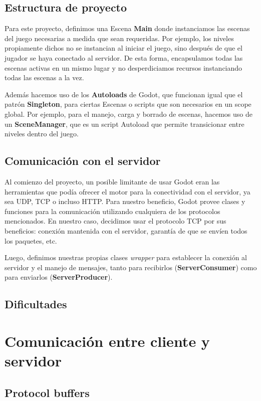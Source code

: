 \documentclass[12pt]{article}
\begin{document}
\subsection{Estructura de proyecto}

Para este proyecto, definimos una Escena \textbf{Main} donde instanciamos las escenas del juego necesarias a medida que sean requeridas. Por ejemplo, los niveles propiamente dichos no se instancian al iniciar el juego, sino después de que el jugador se haya conectado al servidor. De esta forma, encapsulamos todas las escenas activas en un mismo lugar y no desperdiciamos recursos instanciando todas las escenas a la vez.

Además hacemos uso de los \textbf{Autoloads} de Godot, que funcionan igual que el patrón \textbf{Singleton}, para ciertas Escenas o scripts que son necesarios en un scope global. Por ejemplo, para el manejo, carga y borrado de escenas, hacemos uso de un \textbf{SceneManager}, que es un script Autoload que permite transicionar entre niveles dentro del juego. 

\subsection{Comunicación con el servidor}

Al comienzo del proyecto, un posible limitante de usar Godot eran las herramientas que podía ofrecer el motor para la conectividad con el servidor, ya sea UDP, TCP o incluso HTTP. Para nuestro beneficio, Godot provee clases y funciones para la comunicación utilizando cualquiera de los protocolos mencionados. En nuestro caso, decidimos usar el protocolo TCP por sus beneficios: conexión mantenida con el servidor, garantía de que se envíen todos los paquetes, etc.

Luego, definimos nuestras propias clases \textit{wrapper} para establecer la conexión al servidor y el manejo de mensajes, tanto para recibirlos (\textbf{ServerConsumer}) como para enviarlos (\textbf{ServerProducer}).

\subsection{Dificultades}

\section{Comunicación entre cliente y servidor}

\subsection{Protocol buffers}
\end{document}
